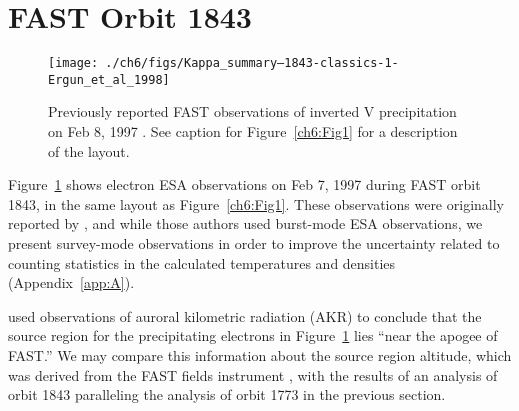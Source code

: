 



  
  \section{FAST Orbit 1843}


  \begin{figure}
    \centering
    \noindent\texttt{[image: ./ch6/figs/Kappa\_summary--1843-classics-1-Ergun\_et\_al\_1998]}
    \caption[Inverted V precipitation and best-fit
    Maxwellian and kappa distribution parameters (Orbit 1843)]{Previously reported
      FAST observations of inverted V precipitation on Feb 8, 1997
      \citep{Ergun1998a,Ergun1998}. See caption for Figure~\ref{ch6:Fig1} for a
      description of the layout.}
    \label{ch6:Fig4}
  \end{figure}


  Figure~\ref{ch6:Fig4} shows electron ESA observations on Feb 7, 1997
  during FAST orbit 1843, in the same layout as
  Figure~\ref{ch6:Fig1}. These observations were originally reported
  by \citet{Ergun1998a,Ergun1998}, and while those authors used
  burst-mode ESA observations, we present survey-mode observations in
  order to improve the uncertainty related to counting statistics in
  the calculated temperatures and densities
  (Appendix~\ref{app:A}). 

  \citet{Ergun1998} used observations of auroral kilometric radiation
  (AKR) to conclude that the source region for the precipitating
  electrons in Figure~\ref{ch6:Fig4} lies ``near the apogee of FAST.''
  We may compare this information about the source region altitude,
  which was derived from the FAST fields instrument \citep{Ergun2001},
  with the results of an analysis of orbit 1843 paralleling the
  analysis of orbit 1773 in the previous section.

